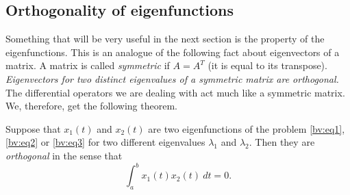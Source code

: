 \subsection{Orthogonality of eigenfunctions}

Something that will be very useful in the next section is the
\emph{} property of the eigenfunctions. This is an analogue
of the following fact about eigenvectors of a matrix.  A matrix is
called
\emph{symmetric}
if $A = A^T$ (it is equal to its transpose).
\emph{Eigenvectors for two distinct eigenvalues of a symmetric
matrix are orthogonal.}
The
differential operators we are dealing with act much like a symmetric matrix.
We, therefore, get the following theorem.

%
%
%

\begin{theorem} \label{bvp:orthogonaleigen}
Suppose that $x_1(t)$ and $x_2(t)$ are two eigenfunctions of the problem
\eqref{bv:eq1}, \eqref{bv:eq2} or \eqref{bv:eq3}
for two different
eigenvalues $\lambda_1$ and $\lambda_2$.  Then they are
\emph{orthogonal}
in the sense that
\begin{equation*}
\int_a^b x_1(t) x_2(t) ~dt = 0 .
\end{equation*}
\end{theorem}

